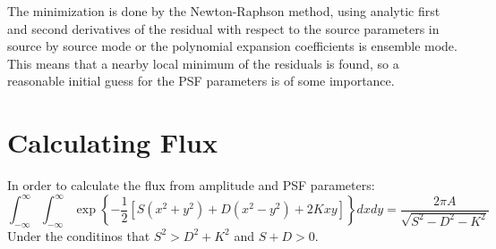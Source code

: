 \documentclass{article}
\begin{document}
The minimization is done by the Newton-Raphson method, using analytic
first and second derivatives of the residual with respect to the source
parameters in source by source mode or the polynomial expansion
coefficients is ensemble mode. This means that a nearby local minimum of
the residuals is found, so a reasonable initial guess for the PSF
parameters is of some importance.

\section{Calculating Flux}
In order to calculate the flux from amplitude and PSF parameters:
\begin{equation}
	\int_{-\infty}^\infty \int_{-\infty}^\infty
	\exp\left\{-\frac{1}{2}\left[S(x^2+y^2)+D(x^2-y^2)+2Kxy\right]\right\}
	dx dy = \frac{2\pi A}{\sqrt{S^2-D^2-K^2}}
\end{equation}
Under the conditinos that $S^2>D^2+K^2$ and $S+D>0$.
\end{document}
